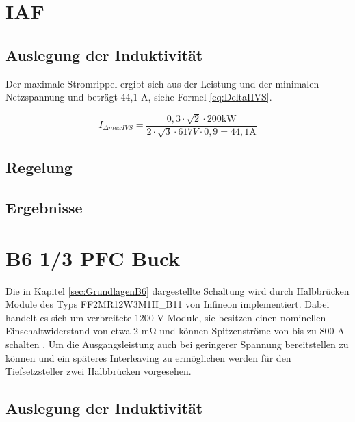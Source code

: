 \section{IAF}

	\cite{IAF99}
	
	\subsection{Auslegung der Induktivität}
	Der maximale Stromrippel ergibt sich aus der Leistung und der minimalen Netzspannung und beträgt 44,1 \si{\A}, siehe Formel \ref{eq:DeltaIIVS}.
	
	\begin{equation}
		\label{eq:DeltaIIVS}
		I_{\Delta max IVS}= \dfrac{0,3\cdot \sqrt{2} \cdot 200 \si{\kilo \watt}}{2 \cdot \sqrt{3} \cdot 617 \si{V} \cdot 0,9 = 44,1 \si{\A}}
	\end{equation}
	
	\subsection{Regelung}
	
	\subsection{Ergebnisse}
	

\section{B6 1/3 PFC Buck}
Die in Kapitel \ref{sec:GrundlagenB6} dargestellte Schaltung wird durch Halbbrücken Module des Typs FF2MR12W3M1H\_B11 von Infineon implementiert. Dabei handelt es sich um verbreitete 1200 \si{\volt} Module, sie besitzen einen nominellen Einschaltwiderstand von etwa 2 \si{\milli \ohm} und können Spitzenströme von bis zu 800 \si{\ampere} schalten \cite{IFAGFF2}. Um die Ausgangsleistung auch bei geringerer Spannung bereitstellen zu können und ein späteres Interleaving zu ermöglichen werden für den Tiefsetzsteller zwei Halbbrücken vorgesehen.

	\subsection{Auslegung der Induktivität}
	
	

